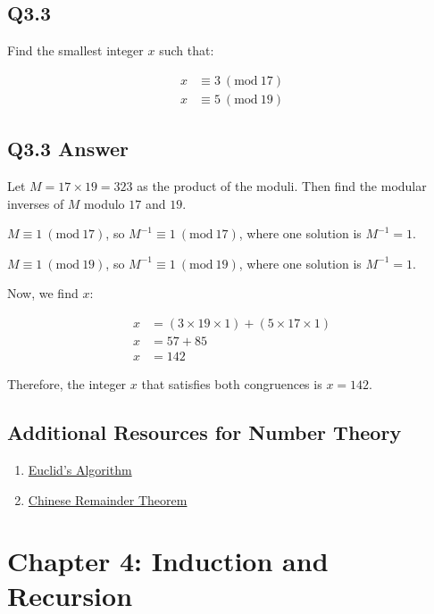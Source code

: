 \documentclass{article}
\begin{document}
\subsection*{Q3.3}
Find the smallest integer $x$ such that:

\[
\begin{align*}
x &\equiv 3 \ (\text{mod}\ 17) \\
x &\equiv 5 \ (\text{mod}\ 19)
\end{align*}
\]

\newpage
\subsection*{Q3.3 Answer}

Let $M = 17 \times 19 = 323$ as the product of the moduli. Then find the modular inverses of $M$ modulo $17$ and $19$.

$M \equiv 1 \ (\text{mod}\ 17)$, so $M^{-1} \equiv 1 \ (\text{mod}\ 17)$, where one solution is $M^{-1} = 1$.

$M \equiv 1 \ (\text{mod}\ 19)$, so $M^{-1} \equiv 1 \ (\text{mod}\ 19)$, where one solution is $M^{-1} = 1$.

Now, we find $x$:

\[
\begin{align*}
x &= (3 \times 19 \times 1) + (5 \times 17 \times 1) \\
x &= 57 + 85 \\
x &= 142
\end{align*}
\]

Therefore, the integer $x$ that satisfies both congruences is $x = 142$.

\newpage

\subsection*{Additional Resources for Number Theory}
\begin{enumerate}
    \item \href{https://www.youtube.com/watch?v=yHwneN6zJmU}{Euclid's Algorithm}
    \item \href{https://www.youtube.com/watch?v=ru7mWZJlRQg&t=276s}{Chinese Remainder Theorem} 
\end{enumerate}
\newpage

\section*{Chapter 4: Induction and Recursion}
\end{document}
